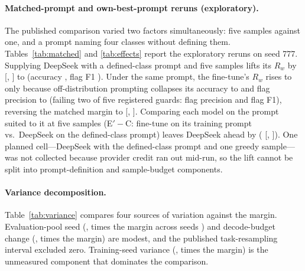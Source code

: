 \documentclass[11pt]{article}
\begin{document}
\begin{table}[t]
\centering\small

\caption{Paired differences in $R_w$ with 95\% task-bootstrap intervals (\resamples{} resamples). Matched and own-prompt rows are exploratory on the seed-777 development pool, whose \texttt{PARTIAL\_MATCH} pairs all appear in training (favouring the fine-tune).}
\label{tab:effects}
\end{table}

\paragraph{Matched-prompt and own-best-prompt reruns (exploratory).} The published comparison varied two factors simultaneously: five samples against one, and a prompt naming four classes without defining them. Tables~\ref{tab:matched} and \ref{tab:effects} report the exploratory reruns on seed 777. Supplying DeepSeek with a defined-class prompt and five samples lifts its $R_w$ by \combEffect{} [\combEffectLo{}, \combEffectHi{}] to \rwMatDS{} (accuracy \accMatDS{}, flag F1 \fOneMatDS{}). Under the same prompt, the fine-tune's $R_w$ rises to \rwMatChamp{} only because off-distribution prompting collapses its accuracy to \accMatChamp{} and flag precision to \precMatChamp{} (failing two of five registered guards: flag precision and flag F1), reversing the matched margin to \matMargin{} [\matMarginLo{}, \matMarginHi{}]. Comparing each model on the prompt suited to it at five samples (E$'-$C: fine-tune on its training prompt vs.\ DeepSeek on the defined-class prompt) leaves DeepSeek ahead by \bestPromptAbs{} (\bestPrompt{} [\bestPromptLo{}, \bestPromptHi{}]). One planned cell---DeepSeek with the defined-class prompt and one greedy sample---was not collected because provider credit ran out mid-run, so the \combEffect{} lift cannot be split into prompt-definition and sample-budget components.

\begin{table}[t]
\centering\small

\caption{Four sources of variation in $R_w$ set against the claimed margin \margin{}. Statistics differ by row and are not directly comparable; task resampling is an interval width rather than an SD.}
\label{tab:variance}
\end{table}

\paragraph{Variance decomposition.} Table~\ref{tab:variance} compares four sources of variation against the \margin{} margin. Evaluation-pool seed (\rwEvalPoolSD{}, \evalPoolOverMargin{} times the margin across seeds \devPoolSeedList{}) and decode-budget change (\rwSamplingMarginal{}, \samplingOverMargin{} times the margin) are modest, and the published task-resampling interval excluded zero. Training-seed variance (\rwSD{}, \sdOverMargin{} times the margin) is the unmeasured component that dominates the comparison.
\end{document}
